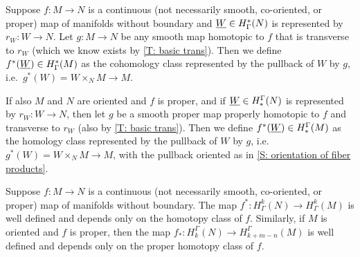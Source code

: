\begin{definition}\label{D: cohomology pullback and homology transfer}
	Suppose $f \colon M \to N$ is a continuous (not necessarily smooth, co-oriented, or proper) map of manifolds without boundary and $\underline{W} \in H^*_\Gamma(N)$ is represented by $r_W \colon W \to N$.
	Let $g \colon M \to N$ be any smooth map homotopic to $f$ that is transverse to $r_W$ (which we know exists by \cref{T: basic trans}).
	Then we define $f^*(\underline{W}) \in H^*_\Gamma(M)$ as the cohomology class represented by the pullback of $W$ by $g$, i.e.\ $g^*(W) = W \times_N M \to M$.

	If also $M$ and $N$ are oriented and $f$ is proper, and if $\underline{W} \in H_*^\Gamma(N)$ is represented by $r_W \colon W \to N$, then let $g$ be a smooth proper map properly homotopic to $f$ and transverse to $r_W$ (also by \cref{T: basic trans}).
	Then we define $f^*(\underline{W}) \in H_*^\Gamma(M)$ as the homology class represented by the pullback of $W$ by $g$, i.e.\ $g^*(W) = W \times_N M \to M$, with the pullback oriented as in \cref{S: orientation of fiber products}.
\end{definition}

\begin{proposition}\label{P: cohomology pullback}
	Suppose $f \colon M \to N$ is a continuous (not necessarily smooth, co-oriented, or proper) map of manifolds without boundary.
	The map $f^* \colon H^k_\Gamma(N) \to H^k_\Gamma(M)$ is well defined and depends only on the homotopy class of $f$.
	Similarly, if $M$ is oriented and $f$ is proper, then the map $f_* \colon H_k^\Gamma(N) \to H_{k+m-n}^\Gamma(M)$ is well defined and depends only on the proper homotopy class of $f$.
\end{proposition}


